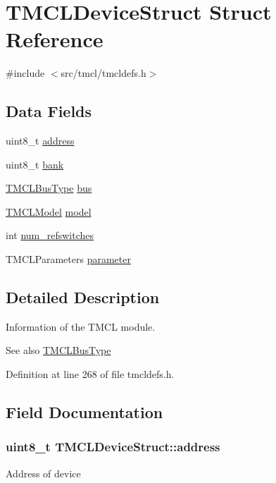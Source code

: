 \hypertarget{structTMCLDeviceStruct}{
\section{TMCLDeviceStruct Struct Reference}
\label{structTMCLDeviceStruct}
}


{\ttfamily \#include $<$src/tmcl/tmcldefs.h$>$}\subsection*{Data Fields}
\begin{DoxyCompactItemize}
\item 
uint8\_\-t \hyperlink{structTMCLDeviceStruct_aa56aa12a3dc7d9bb5bae52937390ce10}{address}
\item 
uint8\_\-t \hyperlink{structTMCLDeviceStruct_aa388813983ca862282b187ba8ca70138}{bank}
\item 
\hyperlink{tmcldefs_8h_ad26e4e286a55d7c739fd473d8cdd882e}{TMCLBusType} \hyperlink{structTMCLDeviceStruct_aa6e5ebc3dd114b186a4ac2276a2dd5a0}{bus}
\item 
\hyperlink{tmcldefs_8h_a35c090090de43d9850d0f573f7d29e45}{TMCLModel} \hyperlink{structTMCLDeviceStruct_a3c710b5d01b3070e5971614d51ff91ff}{model}
\item 
int \hyperlink{structTMCLDeviceStruct_a5988d034898432c253ca780b971b4165}{num\_\-refswitches}
\item 
TMCLParameters \hyperlink{structTMCLDeviceStruct_a95bdba1d9decf882fd8a03b2b2b08373}{parameter}
\end{DoxyCompactItemize}


\subsection{Detailed Description}
Information of the TMCL module.

\begin{DoxySeeAlso}{See also}
\hyperlink{tmcldefs_8h_ad26e4e286a55d7c739fd473d8cdd882e}{TMCLBusType} 
\end{DoxySeeAlso}


Definition at line 268 of file tmcldefs.h.

\subsection{Field Documentation}
\hypertarget{structTMCLDeviceStruct_aa56aa12a3dc7d9bb5bae52937390ce10}{
\subsubsection[{address}]{\setlength{\rightskip}{0pt plus 5cm}uint8\_\-t {\bf TMCLDeviceStruct::address}}}
\label{structTMCLDeviceStruct_aa56aa12a3dc7d9bb5bae52937390ce10}
Address of device 

